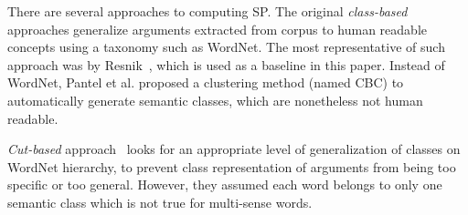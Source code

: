 There are several approaches to computing SP.
The original {\em class-based} approaches 
generalize arguments extracted from corpus to human readable
concepts using a taxonomy such as WordNet.
The most representative of such approach was 
by Resnik~,
which is used as a baseline in this paper.
Instead of WordNet,
Pantel et al.
proposed a clustering method (named CBC) to
automatically generate semantic classes, which are nonetheless
not human readable. 

{\em Cut-based} approach~\cite{li1998generalizing} 
looks for an appropriate level of generalization of classes
on WordNet hierarchy, to prevent class representation of arguments
from being too specific or too general. However, they assumed each word 
belongs to only one semantic class which is not true for multi-sense words.


